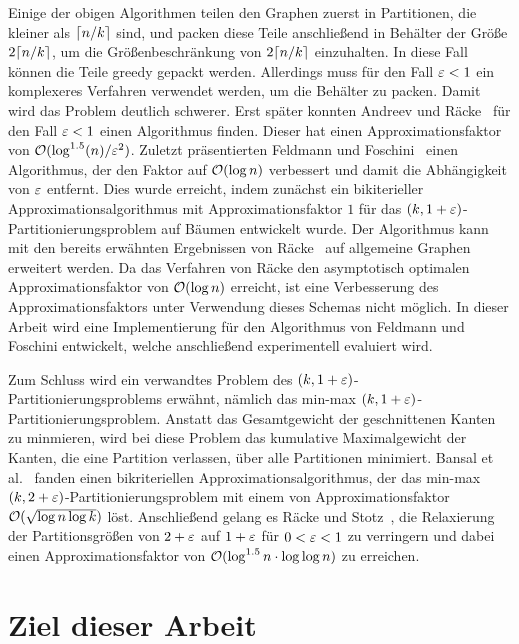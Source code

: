 Einige der obigen Algorithmen teilen den Graphen zuerst in Partitionen, die kleiner als $\lceil n/k\rceil$ sind, und packen diese Teile anschließend in Behälter der Größe $2 \lceil n/k\rceil$, um die Größenbeschränkung von $2 \lceil n/k\rceil$ einzuhalten.
In diese Fall können die Teile greedy gepackt werden.
Allerdings muss für den Fall $\varepsilon < 1$ ein komplexeres Verfahren verwendet werden, um die Behälter zu packen. 
Damit wird das Problem deutlich schwerer.
Erst später konnten Andreev und Räcke~\cite{ar06} für den Fall $\varepsilon < 1$ einen Algorithmus finden.
Dieser hat einen Approximationsfaktor von $\mathcal{O}(\log^{1.5}(n)/\varepsilon^2)$.
Zuletzt präsentierten Feldmann und Foschini~\cite{FF15} einen Algorithmus, der den Faktor auf $\mathcal{O}(\log n)$ verbessert und damit die Abhängigkeit von $\varepsilon$ entfernt.
Dies wurde erreicht, indem zunächst ein bikiterieller Approximationsalgorithmus mit Approximationsfaktor $1$ für das $(k,1+\varepsilon)$\hyp Partitionierungsproblem auf Bäumen entwickelt wurde.
Der Algorithmus kann mit den bereits erwähnten Ergebnissen von Räcke~\cite{rc08} auf allgemeine Graphen erweitert werden.
Da das Verfahren von Räcke den asymptotisch optimalen Approximationsfaktor von $\mathcal{O}(\log n)$ erreicht, ist eine Verbesserung des Approximationsfaktors unter Verwendung dieses Schemas nicht möglich.
In dieser Arbeit wird eine Implementierung für den Algorithmus von Feldmann und Foschini entwickelt, welche anschließend experimentell evaluiert wird.

Zum Schluss wird ein verwandtes Problem des $(k, 1+\varepsilon)$\hyp Partitionierungsproblems erwähnt, nämlich das min-max $(k, 1+\varepsilon)$\hyp Partitionierungsproblem.
Anstatt das Gesamtgewicht der geschnittenen Kanten zu minmieren, wird bei diese Problem das kumulative Maximalgewicht der Kanten, die eine Partition verlassen, über alle Partitionen minimiert.
Bansal et al.~\cite{BFK+11} fanden einen bikriteriellen Approximationsalgorithmus, der das min-max $(k, 2 + \varepsilon)$\hyp Partitionierungsproblem mit einem von Approximationsfaktor $\mathcal{O}(\sqrt{\log n \log k})$ löst.
Anschließend gelang es Räcke und Stotz~\cite{RS16}, die Relaxierung der Partitionsgrößen von $2 + \varepsilon$ auf $1 + \varepsilon$ für $0 < \varepsilon < 1$ zu verringern und dabei einen Approximationsfaktor von $\mathcal{O}(\log^{1.5} n \cdot \log \log n)$ zu erreichen.

\section{Ziel dieser Arbeit}
